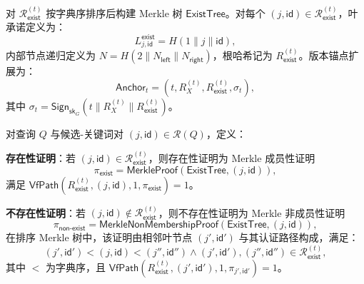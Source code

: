 对 $\mathcal{R}_{\mathsf{exist}}^{(t)}$ 按字典序排序后构建 Merkle 树 $\mathsf{ExistTree}$。对每个 $(j,\mathsf{id})\in\mathcal{R}_{\mathsf{exist}}^{(t)}$，叶承诺定义为：
\begin{equation}
L_{j,\mathsf{id}}^{\mathsf{exist}} = H(1 \| j \| \mathsf{id}),
\end{equation}
内部节点递归定义为 $N = H(2 \| N_{\mathsf{left}} \| N_{\mathsf{right}})$，根哈希记为 $R_{\mathsf{exist}}^{(t)}$。版本锚点扩展为：
\begin{equation}
\mathsf{Anchor}_t = (t, R_X^{(t)}, R_{\mathsf{exist}}^{(t)}, \sigma_t),
\end{equation}
其中 $\sigma_t = \mathsf{Sign}_{\mathsf{sk}_G}(t \| R_X^{(t)} \| R_{\mathsf{exist}}^{(t)})$。

\begin{definition}[存在性证明与不存在性证明]\label{def:existence-proof}
对查询 $Q$ 与候选-关键词对 $(j,\mathsf{id})\in\mathcal{R}(Q)$，定义：

\textbf{存在性证明}：若 $(j,\mathsf{id})\in\mathcal{R}_{\mathsf{exist}}^{(t)}$，则存在性证明为 Merkle 成员性证明
\begin{equation}
\pi_{\mathsf{exist}} = \mathsf{MerkleProof}(\mathsf{ExistTree}, (j,\mathsf{id})),
\end{equation}
满足 $\mathsf{VfPath}(R_{\mathsf{exist}}^{(t)}, (j,\mathsf{id}), 1, \pi_{\mathsf{exist}})=1$。

\textbf{不存在性证明}：若 $(j,\mathsf{id})\notin\mathcal{R}_{\mathsf{exist}}^{(t)}$，则不存在性证明为 Merkle 非成员性证明
\begin{equation}
\pi_{\mathsf{non\text{-}exist}} = \mathsf{MerkleNonMembershipProof}(\mathsf{ExistTree}, (j,\mathsf{id})),
\end{equation}
在排序 Merkle 树中，该证明由相邻叶节点 $(j',\mathsf{id}')$ 与其认证路径构成，满足：
\begin{equation}
(j',\mathsf{id}') < (j,\mathsf{id}) < (j'',\mathsf{id}'') \land (j',\mathsf{id}'),(j'',\mathsf{id}'')\in\mathcal{R}_{\mathsf{exist}}^{(t)},
\end{equation}
其中 $<$ 为字典序，且 $\mathsf{VfPath}(R_{\mathsf{exist}}^{(t)}, (j',\mathsf{id}'), 1, \pi_{j',\mathsf{id}'})=1$。
\end{definition} 


